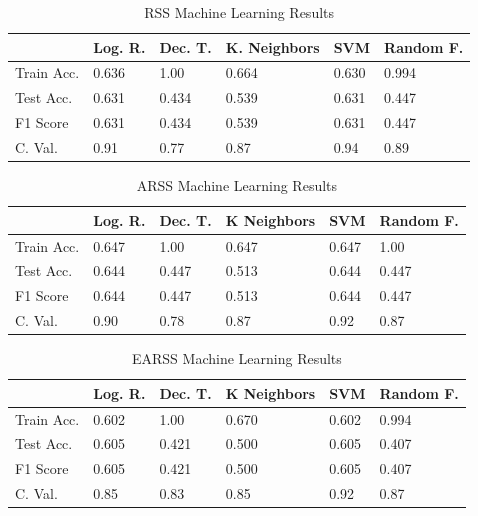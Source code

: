 \documentclass[letterpaper, 10 pt, conference]{ieeeconf}
\begin{document}
\begin{table}[h!]
\begin{tabular}{|l|l|l|l|l|l|}
\hline
           & Log. R. & Dec. T. & K. Neighbors & SVM   & Random F. \\ \hline
Train Acc. & 0.636       & 1.00        & 0.664       & 0.630 & 0.994     \\ \hline
Test Acc.  & 0.631       & 0.434       & 0.539       & 0.631 & 0.447     \\ \hline
F1 Score   & 0.631       & 0.434       & 0.539       & 0.631 & 0.447     \\ \hline
C. Val.   & 0.91       & 0.77       & 0.87       & 0.94 & 0.89     \\ \hline
\end{tabular}
\caption{\label{table}RSS Machine Learning Results}
\end{table}

\begin{table}[h!]
\begin{tabular}{|l|l|l|l|l|l|}
\hline
           & Log. R. & Dec. T. & K Neighbors & SVM   & Random F. \\ \hline
Train Acc. & 0.647       & 1.00        & 0.647       & 0.647 & 1.00      \\ \hline
Test Acc.  & 0.644       & 0.447       & 0.513       & 0.644 & 0.447     \\ \hline
F1 Score   & 0.644       & 0.447       & 0.513       & 0.644 & 0.447     \\ \hline
C. Val.   & 0.90       & 0.78       & 0.87       & 0.92 & 0.87     \\ \hline
\end{tabular}
\caption{\label{table}ARSS Machine Learning Results}
\end{table}

\begin{table}[]
\begin{tabular}{|l|l|l|l|l|l|}
\hline
           & Log. R. & Dec. T. & K Neighbors & SVM   & Random F. \\ \hline
Train Acc. & 0.602       & 1.00        & 0.670       & 0.602 & 0.994     \\ \hline
Test Acc.  & 0.605       & 0.421       & 0.500       & 0.605 & 0.407     \\ \hline
F1 Score   & 0.605       & 0.421       & 0.500       & 0.605 & 0.407     \\ \hline
C. Val.   & 0.85       & 0.83       & 0.85       & 0.92 & 0.87     \\ \hline
\end{tabular}
\caption{\label{table}EARSS Machine Learning Results}
\end{table}
\end{document}
